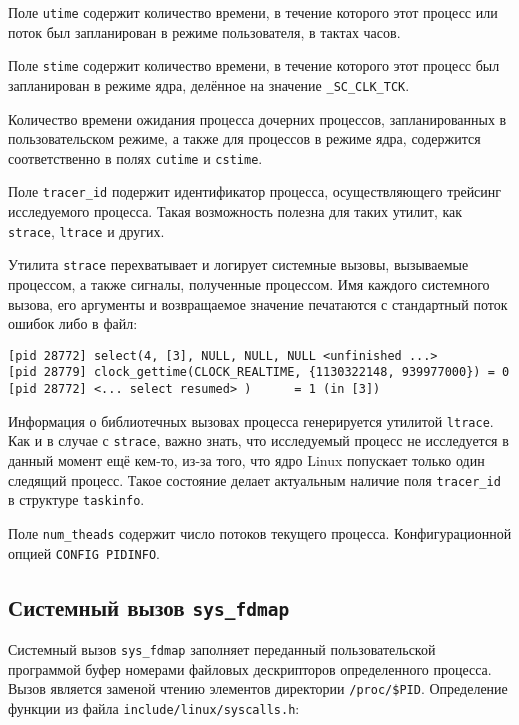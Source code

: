 Поле \texttt{utime} содержит количество времени, в течение которого этот процесс
или поток был запланирован в режиме пользователя, в тактах часов.

Поле \texttt{stime} содержит количество времени, в течение которого этот процесс
был запланирован в режиме ядра, делённое на значение \texttt{\_SC\_CLK\_TCK}.

Количество времени ожидания процесса дочерних процессов, запланированных в
пользовательском режиме, а также для процессов в режиме ядра, содержится
соответственно в полях \texttt{cutime} и \texttt{cstime}.

Поле \texttt{tracer\_id} подержит идентификатор процесса, осуществляющего
трейсинг исследуемого процесса. Такая возможность полезна для таких утилит, как
\texttt{strace}, \texttt{ltrace} и других.

Утилита \texttt{strace} перехватывает и логирует системные вызовы, вызываемые
процессом, а также сигналы, полученные процессом. Имя каждого системного вызова,
его аргументы и возвращаемое значение печатаются с стандартный поток ошибок либо
в файл:

\medskip
\begin{lstlisting}[style=cstyle]
[pid 28772] select(4, [3], NULL, NULL, NULL <unfinished ...>
[pid 28779] clock_gettime(CLOCK_REALTIME, {1130322148, 939977000}) = 0
[pid 28772] <... select resumed> )      = 1 (in [3])
\end{lstlisting}
\medskip

Информация о библиотечных вызовах процесса генерируется утилитой
\texttt{ltrace}. Как и в случае с \texttt{strace}, важно знать, что исследуемый
процесс не исследуется в данный момент ещё кем-то, из-за того, что ядро Linux
попускает только один следящий процесс. Такое состояние делает актуальным
наличие поля \texttt{tracer\_id} в структуре \texttt{taskinfo}.

Поле \texttt{num\_theads} содержит число потоков текущего процесса.
Конфигурационной опцией \texttt{CONFIG\ PIDINFO}.

\subsection{Системный вызов \texttt{sys\_fdmap}}

Системный вызов \texttt{sys\_fdmap} заполняет переданный пользовательской
программой буфер номерами файловых дескрипторов определенного процесса. Вызов
является заменой чтению элементов директории \texttt{/proc/\$PID}. Определение
функции из файла \texttt{include/linux/syscalls.h}:

